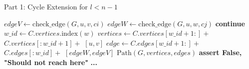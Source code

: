 \begin{algorithm}[H]
    \caption{Part 1: Cycle Extension for \( l < n - 1 \)}
    \begin{algorithmic}
            \For{$[ci, cj] \in [[c1, c2], [c2, c1]]$} 
                            \State $edgeV \gets \text{check\_edge}(G, u, v, ci)$
                            \State $edgeW \gets \text{check\_edge}(G, u, w, cj)$
                                        \State \textbf{continue}
                                    \EndIf
                                    \State $w\_id \gets C.vertices.\text{index}(w)$
                                    \State $vertices \gets C.vertices[w\_id + 1:] +$
                                    \State \hspace{2.5em} $C.vertices[:w\_id + 1] +$
                                    \State \hspace{2.5em} $[u, v]$
                                    \State $edge \gets C.edges[w\_id + 1:] +$
                                    \State \hspace{2.5em} $C.edges[:w\_id] +$
                                    \State \hspace{2.5em} $[edgeW, edgeV]$
                                    \State
                                    \Return $\text{Path}(G, vertices, edges)$
                                \EndFor
                                \State \textbf{assert False, "Should not reach here"}
                            \EndIf
                        \EndIf
                    \EndFor
                \EndFor
            \EndFor
            \State \textbf{...}
        \EndFunction
    \end{algorithmic}
\end{algorithm}

